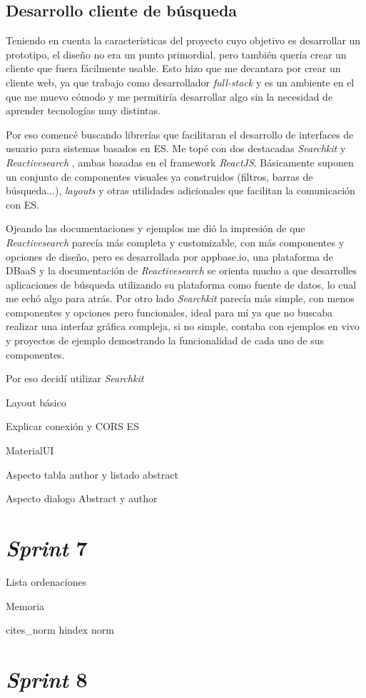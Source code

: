 \subsection{Desarrollo cliente de búsqueda}
Teniendo en cuenta la características del proyecto cuyo objetivo es desarrollar un prototipo, el diseño no era un punto primordial, pero también quería crear un cliente que fuera fácilmente usable. Esto hizo que me decantara por crear un cliente web, ya que trabajo como desarrollador \textit{full-stack} y es un ambiente en el que me muevo cómodo y me permitiría desarrollar algo sin la necesidad de aprender tecnologías muy distintas.

Por eso comencé buscando librerías que facilitaran el desarrollo de interfaces de usuario para sistemas basados en \acrshort{ES}. Me topé con dos destacadas \textit{Searchkit} \cite{searchKit} y \textit{Reactivesearch} \cite{reactiveSearch}, ambas basadas en el \gls{framework} \textit{ReactJS}. Básicamente suponen un conjunto de componentes visuales ya construidos (filtros, barras de búsqueda...), \textit{layouts} y otras utilidades adicionales que facilitan la comunicación con \acrshort{ES}.

Ojeando las documentaciones y ejemplos me dió la impresión de que \textit{Reactivesearch} parecía más completa y customizable, con más componentes y opciones de diseño, pero es desarrollada por appbase.io, una plataforma de \acrshort{DBaaS} y la documentación de \textit{Reactivesearch} se orienta mucho a que desarrolles aplicaciones de búsqueda utilizando su plataforma como fuente de datos, lo cual me echó algo para atrás. Por otro lado \textit{Searchkit} parecía más simple, con menos componentes y opciones pero funcionales, ideal para mí ya que no buscaba realizar una interfaz gráfica compleja, si no simple, contaba con ejemplos en vivo y proyectos de ejemplo demostrando la funcionalidad de cada uno de sus componentes.

Por eso decidí utilizar \textit{Searchkit} 

Layout básico

Explicar conexión y CORS ES

MaterialUI

Aspecto tabla author y listado abstract


Aspecto dialogo Abstract y author


\section{\textit{Sprint} 7}

Lista ordenaciones

Memoria

cites\_norm
hindex norm

\section{\textit{Sprint} 8}